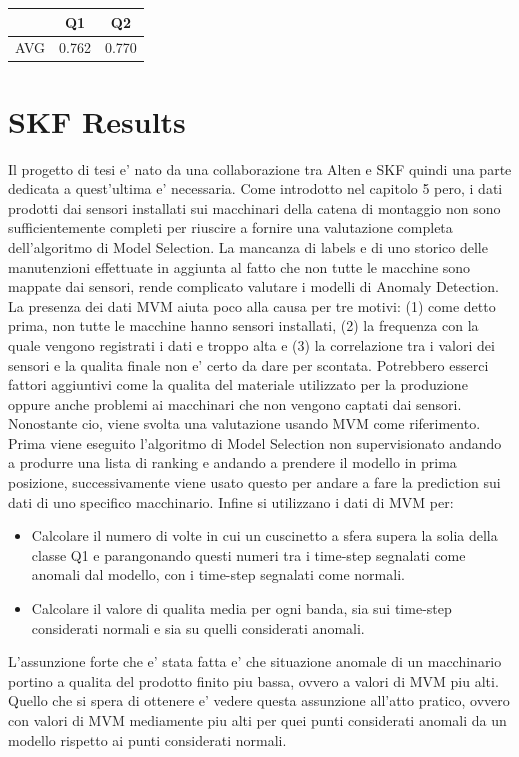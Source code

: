 \begin{table}[]
\begin{tabular}{|l|l|l|}
\hline
    & \multicolumn{1}{c|}{Q1} & \multicolumn{1}{c|}{Q2} \\ \hline
AVG & 0.762                   & 0.770                   \\ \hline
\end{tabular}
\end{table}

\section{SKF Results}
Il progetto di tesi e' nato da una collaborazione tra Alten e SKF quindi una parte dedicata a quest'ultima e' necessaria. Come introdotto nel capitolo 5 pero, i dati prodotti dai sensori installati sui macchinari della catena di montaggio non sono sufficientemente completi per riuscire a fornire una valutazione completa dell'algoritmo di Model Selection. La mancanza di labels e di uno storico delle manutenzioni effettuate in aggiunta al fatto che non tutte le macchine sono mappate dai sensori, rende complicato valutare i modelli di Anomaly Detection. La presenza dei dati MVM aiuta poco alla causa per tre motivi: (1) come detto prima, non tutte le macchine hanno sensori installati, (2) la frequenza con la quale vengono registrati i dati e troppo alta e (3) la correlazione tra i valori dei sensori e la qualita finale non e' certo da dare per scontata. Potrebbero esserci fattori aggiuntivi come la qualita del materiale utilizzato per la produzione oppure anche problemi ai macchinari che non vengono captati dai sensori. 
Nonostante cio, viene svolta una valutazione usando MVM come riferimento. Prima viene eseguito l'algoritmo di Model Selection non supervisionato andando a produrre una lista di ranking e andando a prendere il modello in prima posizione, successivamente viene usato questo per andare a fare la prediction sui dati di uno specifico macchinario. Infine si utilizzano i dati di MVM per:
\begin{itemize}
\item Calcolare il numero di volte in cui un cuscinetto a sfera supera la solia della classe Q1 e parangonando questi numeri tra i time-step segnalati come anomali dal modello, con i time-step segnalati come normali.
\item Calcolare il valore di qualita media per ogni banda, sia sui time-step considerati normali e sia su quelli considerati anomali.
\end{itemize}
L'assunzione forte che e' stata fatta e' che situazione anomale di un macchinario portino a qualita del prodotto finito piu bassa, ovvero a valori di MVM piu alti. Quello che si spera di ottenere e' vedere questa assunzione all'atto pratico, ovvero con valori di MVM mediamente piu alti per quei punti considerati anomali da un modello rispetto ai punti considerati normali.

